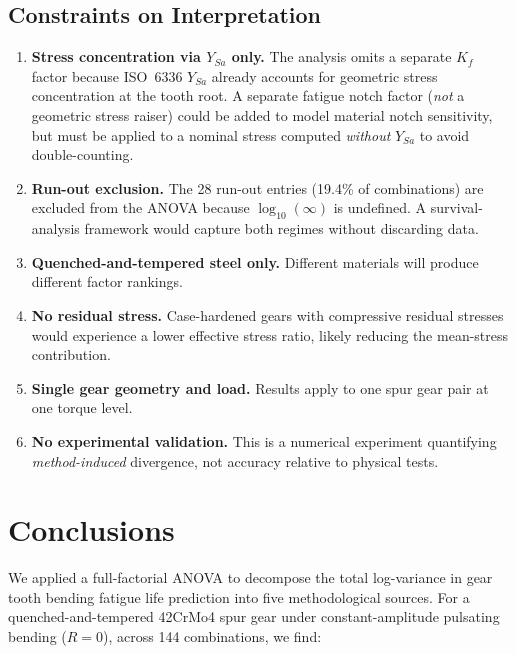 \documentclass[12pt,a4paper]{article}
\begin{document}
\subsection{Constraints on Interpretation}

\begin{enumerate}
  \item \textbf{Stress concentration via $Y_{Sa}$ only.} The analysis
        omits a separate $K_f$ factor because ISO~6336 $Y_{Sa}$ already
        accounts for geometric stress concentration at the tooth root.
        A separate fatigue notch factor (\emph{not} a geometric stress
        raiser) could be added to model material notch sensitivity, but
        must be applied to a nominal stress computed \emph{without} $Y_{Sa}$
        to avoid double-counting.
  \item \textbf{Run-out exclusion.} The 28 run-out entries (19.4\% of
        combinations) are excluded from the ANOVA because
        $\log_{10}(\infty)$ is undefined. A survival-analysis framework
        would capture both regimes without discarding data.
  \item \textbf{Quenched-and-tempered steel only.} Different materials
        will produce different factor rankings.
  \item \textbf{No residual stress.} Case-hardened gears with compressive
        residual stresses would experience a lower effective stress ratio,
        likely reducing the mean-stress contribution.
  \item \textbf{Single gear geometry and load.} Results apply to one spur
        gear pair at one torque level.
  \item \textbf{No experimental validation.} This is a numerical
        experiment quantifying \emph{method-induced} divergence, not
        accuracy relative to physical tests.
\end{enumerate}

\section{Conclusions}
\label{sec:conclusions}

We applied a full-factorial ANOVA to decompose the total log-variance in
gear tooth bending fatigue life prediction into five methodological
sources. For a quenched-and-tempered 42CrMo4 spur gear under
constant-amplitude pulsating bending ($R=0$), across 144 combinations,
we find:
\end{document}
